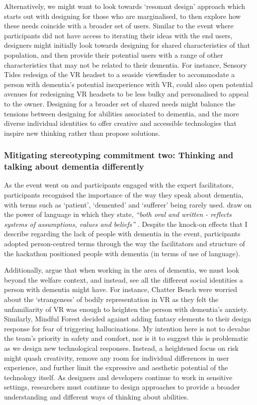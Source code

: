 Alternatively, we might want to look towards \cite{pullin2009design} ‘resonant design’ approach which starts out with designing for those who are marginalised, to then explore how these needs coincide with a broader set of users. Similar to the event where participants did not have access to iterating their ideas with the end users, designers might initially look towards designing for shared characteristics of that population, and then provide their potential users with a range of other characteristics that may not be related to their dementia. For instance, Sensory Tides redesign of the VR headset to a seaside viewfinder to accommodate a person with dementia’s potential inexperience with VR, could also open potential avenues for redesigning VR headsets to be less bulky and personalised to appeal to the owner. Designing for a broader set of shared needs might balance the tensions between designing for abilities associated to dementia, and the more diverse individual identities to offer creative and accessible technologies that inspire new thinking rather than propose solutions.

\subsubsection{Mitigating stereotyping commitment two: Thinking and talking about dementia differently}
\label{DiscussionOne:CommitTwo}
As the event went on and participants engaged with the expert facilitators, participants recognised the importance of the way they speak about dementia, with terms such as `patient', `demented' and `sufferer' being rarely used. \cite{bartlett2010broadening} draw on the power of language in which they state, \textit{``both oral and written - reflects systems of assumptions, values and beliefs''} \citep[pg.52]{bartlett2010broadening}. Despite the knock-on effects that I describe regarding the lack of people with dementia in the event, participants adopted person-centred terms through the way the facilitators and structure of the hackathon positioned people with dementia (in terms of use of language).

Additionally, \cite{bartlett2010broadening} argue that when working in the area of dementia, we must look beyond the welfare context, and instead, see all the different social identities a person with dementia might have. For instance, Chatter Bench were worried about the `strangeness' of bodily representation in VR as they felt the unfamiliarity of VR was enough to heighten the person with dementia's anxiety. Similarly, Mindful Forest decided against adding fantasy elements to their design response for fear of triggering hallucinations. My intention here is not to devalue the team's priority in safety and comfort, nor is it to suggest this is problematic as we design new technological responses. Instead, a heightened focus on risk might quash creativity, remove any room for individual differences in user experience, and further limit the expressive and aesthetic potential of the technology itself. As designers and developers continue to work in sensitive settings, researchers must continue to design approaches to provide a broader understanding and different ways of thinking about abilities. 

